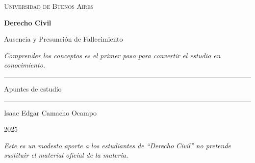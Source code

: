\documentclass[12pt,oneside]{book}
\newcommand{\universidad}{Universidad de Buenos Aires}
\newcommand{\materia}{Derecho Civil}
\newcommand{\titulo}{Ausencia y Presunción de Fallecimiento}
\newcommand{\autor}{Isaac Edgar Camacho Ocampo}
\newcommand{\anio}{2025}
\begin{document}
\begin{titlepage}

\thispagestyle{empty}

\begin{center}

\vspace*{1cm}

{\large \textsc{\universidad}}

\vspace{3cm}

{\Huge \textbf{\materia}}

\vspace{1cm}

{\LARGE \titulo}

\vspace{0.8cm}

\textit{Comprender los conceptos es el primer paso para convertir el estudio en conocimiento.}

\vspace{1.2cm}

\rule{0.70\textwidth}{0.5pt}

\vspace{0.5cm}

{\large Apuntes de estudio}

\vspace{0.5cm}

\rule{0.70\textwidth}{0.5pt}

\vfill

{\large \autor}

\vspace{0.3cm}

{\large \anio}

\end{center}

\vfill

\begin{flushleft}
\textit{Este es un modesto aporte a los estudiantes de ``Derecho Civil'' no pretende sustituir el material oficial de la materia.}
\end{flushleft}

\end{titlepage}

\tableofcontents
\end{document}
